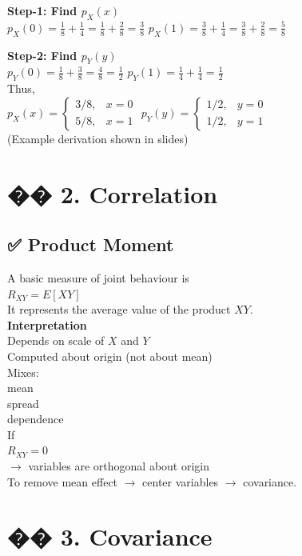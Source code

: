 \documentclass{article}
\begin{document}
\textbf{Step-1: Find $p_X(x)$} \\
$p_X(0)=\frac{1}{8}+\frac{1}{4} =\frac{1}{8}+\frac{2}{8} =\frac{3}{8}$ \quad $p_X(1)=\frac{3}{8}+\frac{1}{4} =\frac{3}{8}+\frac{2}{8} =\frac{5}{8}$

\textbf{Step-2: Find $p_Y(y)$} \\
$p_Y(0)=\frac{1}{8}+\frac{3}{8} =\frac{4}{8} =\frac{1}{2}$ \quad $p_Y(1)=\frac{1}{4}+\frac{1}{4} =\frac{1}{2}$ \\
Thus, \\
$p_X(x)= \begin{cases} 3/8,&x=0\\ 5/8,&x=1 \end{cases}$ \quad $p_Y(y)= \begin{cases} 1/2,&y=0\\ 1/2,&y=1 \end{cases}$ \\
(Example derivation shown in slides)

\section{�� 2. Correlation}

\subsection{✅ Product Moment}
A basic measure of joint behaviour is \\
$R_{XY}=E[XY]$ \\
It represents the average value of the product $XY$. \\
\textbf{Interpretation} \\
Depends on scale of $X$ and $Y$ \\
Computed about origin (not about mean) \\
Mixes: \\
mean \\
spread \\
dependence \\
If \\
$R_{XY}=0$ \\
$\rightarrow$ variables are orthogonal about origin \\
To remove mean effect $\rightarrow$ center variables $\rightarrow$ covariance.

\section{�� 3. Covariance}
\end{document}
